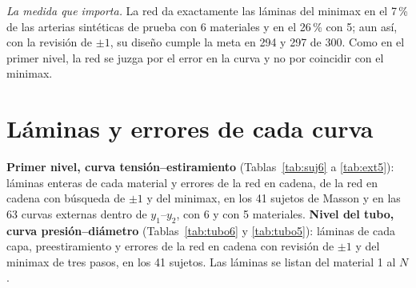 \emph{La medida que importa.} La red da exactamente las láminas del minimax en el 7\,\% de las arterias sintéticas de prueba con 6 materiales y en el 26\,\% con 5; aun así, con la revisión de $\pm1$, su diseño cumple la meta en 294 y 297 de 300. Como en el primer nivel, la red se juzga por el error en la curva y no por coincidir con el minimax.

\clearpage
\section{Láminas y errores de cada curva}\label{sec:tablas}
\textbf{Primer nivel, curva tensión--estiramiento} (Tablas~\ref{tab:suj6} a \ref{tab:ext5}): láminas enteras de cada material y errores de la red en cadena, de la red en cadena con búsqueda de $\pm1$ y del minimax, en los 41 sujetos de Masson y en las 63 curvas externas dentro de $y_1$--$y_2$, con 6 y con 5 materiales. \textbf{Nivel del tubo, curva presión--diámetro} (Tablas~\ref{tab:tubo6} y \ref{tab:tubo5}): láminas de cada capa, preestiramiento y errores de la red en cadena con revisión de $\pm1$ y del minimax de tres pasos, en los 41 sujetos. Las láminas se listan del material 1 al $N$.







